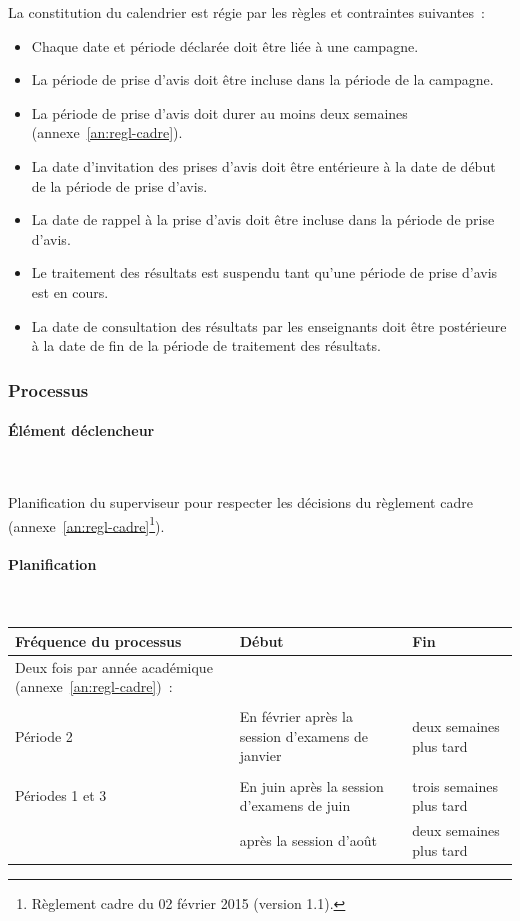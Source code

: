 \documentclass[a4paper,11pt]{report}
\begin{document}
La constitution du calendrier est régie par les règles et contraintes suivantes~:
\begin{itemize}
	\item Chaque date et période déclarée doit être liée à une campagne.
	\item La période de prise d'avis doit être incluse dans la période de la campagne.
	\item La période de prise d'avis doit durer au moins deux semaines (annexe~\ref{an:regl-cadre}).
	\item La date d'invitation des prises d'avis doit être entérieure à la date de début de la période de prise d'avis.
	\item La date de rappel à la prise d'avis doit être incluse dans la période de prise d'avis.
	\item Le traitement des résultats est suspendu tant qu'une période de prise d'avis est en cours.
	\item La date de consultation des résultats par les enseignants doit être postérieure à la date de fin de la période de traitement des résultats.
\end{itemize}


\subsubsection{Processus}
\paragraph{Élément déclencheur}~\newline{}

Planification du superviseur pour respecter les décisions du règlement cadre (annexe~\ref{an:regl-cadre}\footnote{Règlement cadre du 02 février 2015 (version 1.1).}).

\paragraph{Planification}\label{sec:calendrier-processus-plan}~\newline{}

\begin{tabularx}{\linewidth}{|X|X|X|} \hline
Fréquence du processus & Début & Fin \\ \hline
Deux fois par année académique (annexe~\ref{an:regl-cadre})~: & & \\
& & \\
Période 2 & En février après la session d'examens de janvier & deux semaines plus tard \\
& & \\ %
Périodes 1 et 3 & En juin après la session d'examens de juin & trois semaines plus tard \\
& après la session d'août & deux semaines plus tard \\ \hline
\end{tabularx}
\end{document}
